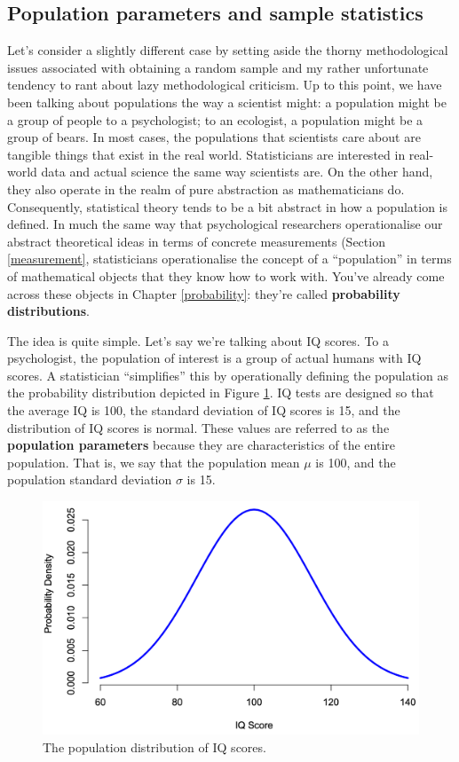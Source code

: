 \documentclass[
]{book}
\theoremstyle{definition}
\theoremstyle{definition}
\theoremstyle{definition}
\theoremstyle{definition}
\theoremstyle{remark}
\begin{document}
\hypertarget{population-parameters-and-sample-statistics}{%
\subsection{Population parameters and sample statistics}\label{population-parameters-and-sample-statistics}}

Let's consider a slightly different case by setting aside the thorny methodological issues associated with obtaining a random sample and my rather unfortunate tendency to rant about lazy methodological criticism. Up to this point, we have been talking about populations the way a scientist might: a population might be a group of people to a psychologist; to an ecologist, a population might be a group of bears. In most cases, the populations that scientists care about are tangible things that exist in the real world. Statisticians are interested in real-world data and actual science the same way scientists are. On the other hand, they also operate in the realm of pure abstraction as mathematicians do. Consequently, statistical theory tends to be a bit abstract in how a population is defined. In much the same way that psychological researchers operationalise our abstract theoretical ideas in terms of concrete measurements (Section \ref{measurement}, statisticians operationalise the concept of a ``population'' in terms of mathematical objects that they know how to work with. You've already come across these objects in Chapter \ref{probability}: they're called \textbf{probability distributions}.

The idea is quite simple. Let's say we're talking about IQ scores. To a psychologist, the population of interest is a group of actual humans with IQ scores. A statistician ``simplifies'' this by operationally defining the population as the probability distribution depicted in Figure \ref{fig:IQdista}. IQ tests are designed so that the average IQ is 100, the standard deviation of IQ scores is 15, and the distribution of IQ scores is normal. These values are referred to as the \textbf{population parameters} because they are characteristics of the entire population. That is, we say that the population mean \(\mu\) is 100, and the population standard deviation \(\sigma\) is 15.

\begin{figure}

{\centering \includegraphics[width=0.66\linewidth]{resources/image/IQdista} 

}

\caption{The population distribution of IQ scores.}\label{fig:IQdista}
\end{figure}
\end{document}
